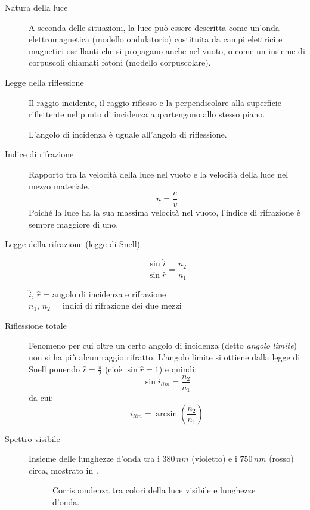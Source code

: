 \documentclass[a4paper,11pt,italian]{article}
\begin{document}
\begin{description}
  \item[Natura della luce] 
  A seconda delle situazioni, la luce può essere descritta come un'onda elettromagnetica (modello ondulatorio) costituita da campi elettrici e magnetici oscillanti che si propagano anche nel vuoto, o come un insieme di corpuscoli chiamati fotoni (modello corpuscolare).
  
  \item[Legge della riflessione] 
  Il raggio incidente, il raggio riflesso e la perpendicolare alla superficie riflettente nel punto di incidenza appartengono allo stesso piano.
  
  L'angolo di incidenza è uguale all'angolo di riflessione.
  
  \item[Indice di rifrazione] 
  Rapporto tra la velocità della luce nel vuoto e la velocità della luce nel mezzo materiale.
  \[ n = \frac{c}{v} \]
  Poiché la luce ha la sua massima velocità nel vuoto, l'indice di rifrazione è sempre maggiore di uno.
  
  \item[Legge della rifrazione (legge di Snell)]
  \[ \frac{\sin \hat{i} }{\sin \hat{r}} = \frac{n_2}{n_1} \]
  \begin{multicols}{2}
  $ \hat{i} $, $ \hat{r} $ = angolo di incidenza e rifrazione\\
  $ n_1 $, $ n_2 $ = indici di rifrazione dei due mezzi
  \end{multicols}
  
  \item[Riflessione totale] 
  Fenomeno per cui oltre un certo angolo di incidenza (detto \emph{angolo limite}) non si ha più alcun raggio rifratto. L'angolo limite si ottiene dalla legge di Snell ponendo $ \hat{r} = \frac{\pi}{2} $ (cioè $ \sin \hat{r} = 1 $) e quindi:
  \[ \sin \hat{i}_{lim} = \frac{n_2}{n_1} \]
  da cui:
  \[ \hat{i}_{lim} = \arcsin \left( \frac{n_2}{n_1} \right) \]
  
  \item[Spettro visibile] 
  Insieme delle lunghezze d'onda tra i $ 380 \, nm $ (violetto) e i $ 750 \, nm $ (rosso) circa, mostrato in .
  
  \begin{figure}[htb]\centering
    \pgfspectra[axis,axis step=30,end=750]
    \caption{Corrispondenza tra colori della luce visibile e lunghezze d'onda.}
    \label{img:spettrovisibile}
  \end{figure}
  

\end{description}
\end{document}

